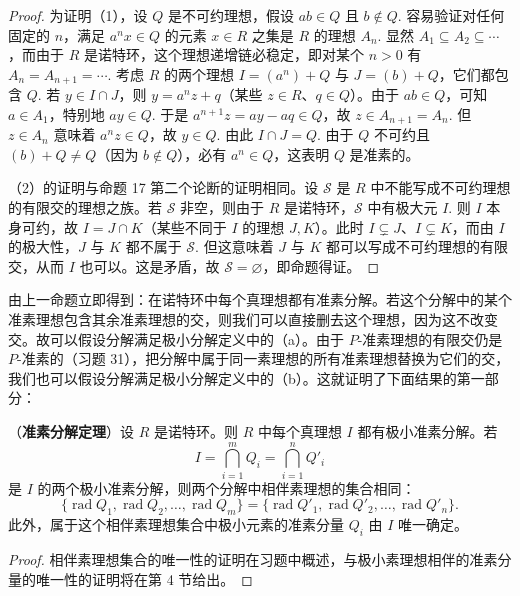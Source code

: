 \begin{proof}
为证明（1），设 \(Q\) 是不可约理想，假设 \(ab \in Q\) 且 \(b \notin Q\). 容易验证对任何固定的 \(n\)，满足 \(a^nx \in Q\) 的元素 \(x \in R\) 之集是 \(R\) 的理想 \(A_n\). 显然 \(A_1 \subseteq A_2 \subseteq \cdots\)，而由于 \(R\) 是诺特环，这个理想递增链必稳定，即对某个 \(n > 0\) 有 \(A_n = A_{n+1} = \cdots\). 考虑 \(R\) 的两个理想 \(I = (a^n)+Q\) 与 \(J = (b)+Q\)，它们都包含 \(Q\). 若 \(y \in I \cap J\)，则 \(y = a^nz+q\)（某些 \(z \in R\)、\(q \in Q\)）。由于 \(ab \in Q\)，可知 \(a \in A_1\)，特别地 \(ay \in Q\). 于是 \(a^{n+1}z = ay-aq \in Q\)，故 \(z \in A_{n+1} = A_n\). 但 \(z \in A_n\) 意味着 \(a^nz \in Q\)，故 \(y \in Q\). 由此 \(I \cap J = Q\). 由于 \(Q\) 不可约且 \((b)+Q \neq Q\)（因为 \(b \notin Q\)），必有 \(a^n \in Q\)，这表明 \(Q\) 是准素的。

（2）的证明与命题 17 第二个论断的证明相同。设 \(\mathcal{S}\) 是 \(R\) 中不能写成不可约理想的有限交的理想之族。若 \(\mathcal{S}\) 非空，则由于 \(R\) 是诺特环，\(\mathcal{S}\) 中有极大元 \(I\). 则 \(I\) 本身可约，故 \(I = J \cap K\)（某些不同于 \(I\) 的理想 \(J, K\)）。此时 \(I \subsetneq J\)、\(I \subsetneq K\)，而由 \(I\) 的极大性，\(J\) 与 \(K\) 都不属于 \(\mathcal{S}\). 但这意味着 \(J\) 与 \(K\) 都可以写成不可约理想的有限交，从而 \(I\) 也可以。这是矛盾，故 \(\mathcal{S} = \varnothing\)，即命题得证。
\end{proof}

由上一命题立即得到：在诺特环中每个真理想都有准素分解。若这个分解中的某个准素理想包含其余准素理想的交，则我们可以直接删去这个理想，因为这不改变交。故可以假设分解满足极小分解定义中的（a）。由于 \(P\)-准素理想的有限交仍是 \(P\)-准素的（习题 31），把分解中属于同一素理想的所有准素理想替换为它们的交，我们也可以假设分解满足极小分解定义中的（b）。这就证明了下面结果的第一部分：

\begin{theorem}\label{thm:15.21}
（\textbf{准素分解定理}）设 \(R\) 是诺特环。则 \(R\) 中每个真理想 \(I\) 都有极小准素分解。若
\[
I = \bigcap_{i=1}^{m}Q_i = \bigcap_{i=1}^{n}Q'_i
\]
是 \(I\) 的两个极小准素分解，则两个分解中相伴素理想的集合相同：
\[
\{\operatorname{rad}Q_1, \operatorname{rad}Q_2, \ldots, \operatorname{rad}Q_m\} = \{\operatorname{rad}Q'_1, \operatorname{rad}Q'_2, \ldots, \operatorname{rad}Q'_n\}.
\]
此外，属于这个相伴素理想集合中极小元素的准素分量 \(Q_i\) 由 \(I\) 唯一确定。
\end{theorem}

\begin{proof}
相伴素理想集合的唯一性的证明在习题中概述，与极小素理想相伴的准素分量的唯一性的证明将在第 4 节给出。
\end{proof}

